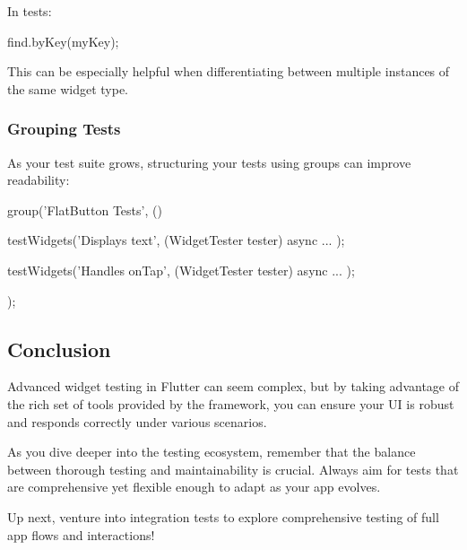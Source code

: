 In tests:
\begin{dartcode}
find.byKey(myKey);
\end{dartcode}

This can be especially helpful when differentiating between multiple instances of the same widget type.

\subsubsection*{Grouping Tests}

As your test suite grows, structuring your tests using groups can improve readability:

\begin{dartcode}
group('FlatButton Tests', () {
  testWidgets('Displays text', (WidgetTester tester) async {
    ...
  });

  testWidgets('Handles onTap', (WidgetTester tester) async {
    ...
  });
});
\end{dartcode}

\subsection*{Conclusion}

Advanced widget testing in Flutter can seem complex, but by taking advantage of the rich set of tools provided by the framework, you can ensure your UI is robust and responds correctly under various scenarios.

As you dive deeper into the testing ecosystem, remember that the balance between thorough testing and maintainability is crucial. 
Always aim for tests that are comprehensive yet flexible enough to adapt as your app evolves.

Up next, venture into integration tests to explore comprehensive testing of full app flows and interactions!






